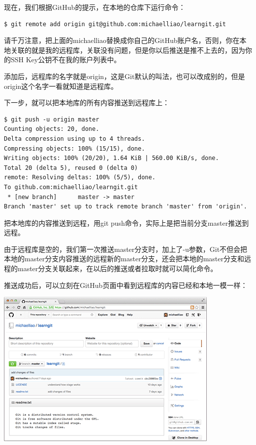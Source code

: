 \documentclass[•]{article}
\begin{document}
\begin{CJK}{UTF8}{gbsn}
\qquad 现在，我们根据GitHub的提示，在本地的\fbox{\color{red}{learngit}}仓库下运行命令：
\begin{lstlisting} 
$ git remote add origin git@github.com:michaelliao/learngit.git
\end{lstlisting}

请千万注意，把上面的michaelliao替换成你自己的GitHub账户名，否则，你在本地关联的就是我的远程库，关联没有问题，但是你以后推送是推不上去的，因为你的SSH Key公钥不在我的账户列表中。

添加后，远程库的名字就是origin，这是Git默认的叫法，也可以改成别的，但是origin这个名字一看就知道是远程库。

下一步，就可以把本地库的所有内容推送到远程库上：
\begin{lstlisting} 
$ git push -u origin master
Counting objects: 20, done.
Delta compression using up to 4 threads.
Compressing objects: 100% (15/15), done.
Writing objects: 100% (20/20), 1.64 KiB | 560.00 KiB/s, done.
Total 20 (delta 5), reused 0 (delta 0)
remote: Resolving deltas: 100% (5/5), done.
To github.com:michaelliao/learngit.git
 * [new branch]      master -> master
Branch 'master' set up to track remote branch 'master' from 'origin'.
\end{lstlisting}

把本地库的内容推送到远程，用git push命令，实际上是把当前分支master推送到远程。

由于远程库是空的，我们第一次推送master分支时，加上了-u参数，Git不但会把本地的master分支内容推送的远程新的master分支，还会把本地的master分支和远程的master分支关联起来，在以后的推送或者拉取时就可以简化命令。

推送成功后，可以立刻在GitHub页面中看到远程库的内容已经和本地一模一样：

\begin{center}
\includegraphics[scale=0.6]{6.png}
\end{center}


\end{CJK}
\end{document}
